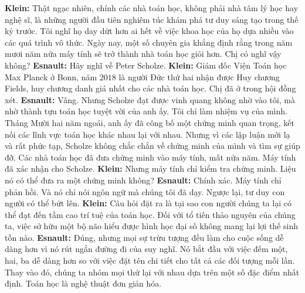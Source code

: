 \begin{multicols}{2}
	\vskip 0.1cm
	\textbf{\color{doithoaitoanhoc}Klein:} Thật ngạc nhiên, chính các nhà toán học, không phải nhà tâm lý học hay nghệ sĩ, là những người đầu tiên nghiêm túc khám phá tư duy sáng tạo trong thế kỷ trước. Tôi nghĩ họ day dứt hơn ai hết về việc khoa học của họ dựa nhiều vào các quá trình vô thức. Ngày nay, một số chuyên gia khẳng định rằng trong năm mươi năm nữa máy tính sẽ trở \linebreak thành nhà toán học giỏi hơn. Chị có nghĩ vậy không?
	\vskip 0.1cm
	\textbf{\color{doithoaitoanhoc}Esnault:} Hãy nghĩ về Peter Scholze.
	\vskip 0.1cm
	\textbf{\color{doithoaitoanhoc}Klein:} Giám đốc Viện Toán học Max Planck ở Bonn, năm $2018$ là người Đức thứ hai nhận được Huy chương Fields, huy chương danh giá nhất cho các nhà toán học. Chị đã ở trong hội đồng xét.
	\vskip 0.1cm
	\textbf{\color{doithoaitoanhoc}Esnault:} Vâng. Nhưng Scholze đạt được \linebreak vinh quang không nhờ vào tôi, mà nhờ \linebreak thành tựu toán học tuyệt vời của anh ấy. Tôi chỉ làm nhiệm vụ của mình. Tháng Mười hai năm ngoái, anh ấy đã công bố một chứng \linebreak minh quan trọng, kết nối các lĩnh vực toán học khác nhau lại với nhau. Nhưng vì các lập luận mới lạ và rất phức tạp, Scholze không chắc chắn về chứng minh của mình và tìm sự giúp đỡ. Các nhà toán học đã đưa chứng \linebreak minh vào máy tính, mất nửa năm. Máy tính đã xác nhận cho Scholze.
	\vskip 0.1cm
	\textbf{\color{doithoaitoanhoc}Klein:} Nhưng máy tính chỉ kiểm tra chứng minh. Liệu nó có thể đưa ra một chứng minh không?
	\vskip 0.1cm
	\textbf{\color{doithoaitoanhoc}Esnault:} Chính xác. Máy tính chỉ phản hồi. Và nó chỉ nói ngôn ngữ mà chúng tôi đã dạy. Ngược lại, tư duy con người có thể bứt lên.
	\vskip 0.1cm
	\textbf{\color{doithoaitoanhoc}Klein:} Câu hỏi đặt ra là tại sao con người chúng ta lại có thể đạt đến tầm cao trí tuệ của toán học. Đối với tổ tiên thảo nguyên của chúng ta, việc sở hữu một bộ não hiểu được hình học đại số không mang lại lợi thế sinh tồn nào.
	\vskip 0.1cm
	\textbf{\color{doithoaitoanhoc}Esnault:} Đúng, nhưng mọi sự trừu tượng đều làm cho cuộc sống dễ dàng hơn vì nó rút ngắn đường đi của suy nghĩ. Nó bắt đầu với việc đếm một, hai, ba dễ dàng hơn so với việc đặt tên chi tiết cho tất cả các đối tượng mỗi lần. Thay vào đó, chúng ta nhóm mọi thứ lại với nhau dựa trên một số đặc điểm nhất định. Toán học là nghệ thuật đơn giản hóa.
	\begin{figure}[H]
		\centering
		\vspace*{-5pt}

\end{figure}
\end{multicols}
